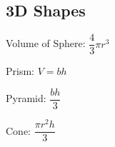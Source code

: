 \subsection{3D Shapes}

Volume of Sphere: $ \dfrac{4}{3} \pi r^3 $

Prism: $ V = b h $

Pyramid: $ \dfrac{bh}{3} $

Cone: $ \dfrac{\pi r^2 h}{3} $